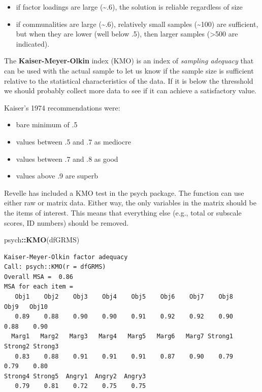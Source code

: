 \documentclass[
  english,
]{book}
\newenvironment{Shaded}{\begin{snugshade}}{\end{snugshade}}
\newcommand{\KeywordTok}[1]{\textcolor[rgb]{0.13,0.29,0.53}{\textbf{#1}}}
\newcommand{\NormalTok}[1]{#1}
\newcommand{\OperatorTok}[1]{\textcolor[rgb]{0.81,0.36,0.00}{\textbf{#1}}}
\providecommand{\tightlist}{%
  \setlength{\itemsep}{0pt}\setlength{\parskip}{0pt}}
\begin{document}
\begin{itemize}
\tightlist
\item
  if factor loadings are large (\textasciitilde.6), the solution is reliable regardless of size
\item
  if communalities are large (\textasciitilde.6), relatively small samples (\textasciitilde100) are sufficient, but when they are lower (well below .5), then larger samples (\textgreater500 are indicated).
\end{itemize}

The \textbf{Kaiser-Meyer-Olkin} index (KMO) is an index of \emph{sampling adequacy} that can be used with the actual sample to let us know if the sample size is sufficient relative to the statistical characteristics of the data. If it is below the thresshold we should probably collect more data to see if it can achieve a satisfactory value.

Kaiser's 1974 recommendations were:

\begin{itemize}
\tightlist
\item
  bare minimum of .5
\item
  values between .5 and .7 as mediocre
\item
  values between .7 and .8 as good
\item
  values above .9 are superb
\end{itemize}

Revelle has included a KMO test in the psych package. The function can use either raw or matrix data. Either way, the only variables in the matrix should be the items of interest. This means that everything else (e.g., total or subscale scores, ID numbers) should be removed.

\begin{Shaded}
\begin{Highlighting}[]
\NormalTok{psych}\OperatorTok{::}\KeywordTok{KMO}\NormalTok{(dfGRMS)}
\end{Highlighting}
\end{Shaded}

\begin{verbatim}
Kaiser-Meyer-Olkin factor adequacy
Call: psych::KMO(r = dfGRMS)
Overall MSA =  0.86
MSA for each item = 
   Obj1    Obj2    Obj3    Obj4    Obj5    Obj6    Obj7    Obj8    Obj9   Obj10 
   0.89    0.88    0.90    0.90    0.91    0.92    0.92    0.90    0.88    0.90 
  Marg1   Marg2   Marg3   Marg4   Marg5   Marg6   Marg7 Strong1 Strong2 Strong3 
   0.83    0.88    0.91    0.91    0.91    0.87    0.90    0.79    0.79    0.80 
Strong4 Strong5  Angry1  Angry2  Angry3 
   0.79    0.81    0.72    0.75    0.75 
\end{verbatim}
\end{document}
